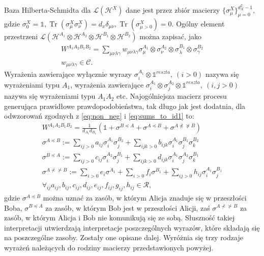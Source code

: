 \documentclass[10pt]{article} %
\DeclareMathOperator{\Trs}{Tr}
\newcommand{\Mats}[1]{\mathcal{L}(#1)}
\newcommand{\Hx}[1]{\mathcal{H}^{#1}}
\newcommand{\LHx}[1]{\Mats{\Hx{#1}}}
\newcommand{\Tr}[1]{\Trs(#1)}
\newcommand{\WAll}{W^{A_1A_2B_1B_2}}
\begin{document}
Baza Hilberta-Schmidta dla $\LHx{X}$ dane jest przez zbiór macierzy $\{\sigma^X_\mu\}^{d^2_X-1}_{\mu=0},$ gdzie $\sigma^X_0 = \mathbb{1}, \Tr{\sigma^X_\mu\sigma^X_\nu}=d_x\delta_{\mu\nu}, \Tr{\sigma^X_{\mu>0}}=0.$ Ogólny element przestrzeni $\Mats{\Hx{A_1}\otimes\Hx{A_2}\otimes\Hx{B_1}\otimes\Hx{B_2}}$ można zapisać, jako
\begin{gather}
\WAll = \sum_{\mu\nu\lambda\gamma} w_{\mu\nu\lambda\gamma} \sigma_\mu^{A_1}\otimes\sigma_\nu^{A_2}\otimes\sigma_\lambda^{B_1}\otimes\sigma_\gamma^{B_2} \\
w_{\mu\nu\lambda\gamma} \in \mathcal{C} \nonumber.
\end{gather}
Wyrażenia zawierające wyłącznie wyrazy $\sigma^{A_1}_i \otimes \mathbb{1}^{reszta},~(i > 0)$ nazywa się wyrażeniami typu $A_1$, wyrażenia zawierające  $\sigma^{A_1}_i \otimes \sigma^{A_2}_j \otimes \mathbb{1}^{reszta},~(i, j > 0)$ nazywa się wyrażeniami typu $A_1A_2$ etc.
Najogólniejsza macierz procesu generująca prawidłowe prawdopodobieństwa, tak długo jak jest dodatnia, dla odwzorowań zgodnych z \eqref{eq:non_neg} i \eqref{eq:sums_to_id1} to:
\begin{gather}
\WAll = \frac{1}{d_{A_1}d_{B_1}}(\mathbb{1} +\sigma^{B \preceq A} + \sigma^{A \preceq B} + \sigma^{A \npreceq \nsucceq B}) \\
\sigma^{A \preceq B} := \sum_{ij>0} a_{ij} \sigma^{A_1}_i \sigma^{B_2}_j + \sum_{ijk>0} b_{ijk} \sigma^{A_1}_i \sigma^{B_1}_j \sigma^{B_2}_k \\
\sigma^{B \preceq A} := \sum_{ij>0} c_{ij} \sigma^{A_2}_i \sigma^{B_1}_j + \sum_{ijk>0} d_{ijk} \sigma^{A_1}_i \sigma^{A_2}_j \sigma^{B_1}_k \\
 \sigma^{A \nprec \nsucc B} := \sum_{i>0} e_i  \sigma^{A_1} + \sum_{i>0} f_i  \sigma^{B_1} + \sum_{ij>0} h_{ij} \sigma^{A_1}_i \sigma^{B_1}_j \\
 \forall_{ij} a_{ij}, b_{ij}, c_{ij}, d_{ij}, e_{ij}, f_{ij}, g_{ij}, h_{ij} \in \mathcal{R} \nonumber,
\end{gather}
gdzie $\sigma^{A \preceq B}$ można uznać za zasób, w którym Alicja znaduje się w przeszłości Boba, $\sigma^{B \preceq A}$ za zasób, w którym Bob jest w przeszłości Alicji, zaś $\sigma^{A \nprec \nsucc B}$ za zasób, w którym Alicja i Bob nie komunikują się ze sobą. Słuszność takiej interpretacji utwierdzają interpretacje poszczególnych wyrazów, które składają się na poszczególne zasoby. Zostały one opisane dalej.
Wyróżnia się trzy rodzaje wyrażeń należących do rodziny macierzy przedstawionych powyżej.
\end{document}
